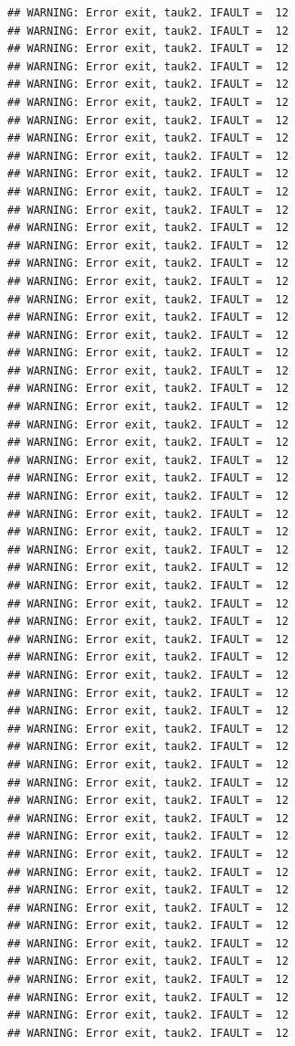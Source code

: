 \documentclass[
  12pt,
]{article}
\begin{document}
\begin{verbatim}
## WARNING: Error exit, tauk2. IFAULT =  12
## WARNING: Error exit, tauk2. IFAULT =  12
## WARNING: Error exit, tauk2. IFAULT =  12
## WARNING: Error exit, tauk2. IFAULT =  12
## WARNING: Error exit, tauk2. IFAULT =  12
## WARNING: Error exit, tauk2. IFAULT =  12
## WARNING: Error exit, tauk2. IFAULT =  12
## WARNING: Error exit, tauk2. IFAULT =  12
## WARNING: Error exit, tauk2. IFAULT =  12
## WARNING: Error exit, tauk2. IFAULT =  12
## WARNING: Error exit, tauk2. IFAULT =  12
## WARNING: Error exit, tauk2. IFAULT =  12
## WARNING: Error exit, tauk2. IFAULT =  12
## WARNING: Error exit, tauk2. IFAULT =  12
## WARNING: Error exit, tauk2. IFAULT =  12
## WARNING: Error exit, tauk2. IFAULT =  12
## WARNING: Error exit, tauk2. IFAULT =  12
## WARNING: Error exit, tauk2. IFAULT =  12
## WARNING: Error exit, tauk2. IFAULT =  12
## WARNING: Error exit, tauk2. IFAULT =  12
## WARNING: Error exit, tauk2. IFAULT =  12
## WARNING: Error exit, tauk2. IFAULT =  12
## WARNING: Error exit, tauk2. IFAULT =  12
## WARNING: Error exit, tauk2. IFAULT =  12
## WARNING: Error exit, tauk2. IFAULT =  12
## WARNING: Error exit, tauk2. IFAULT =  12
## WARNING: Error exit, tauk2. IFAULT =  12
## WARNING: Error exit, tauk2. IFAULT =  12
## WARNING: Error exit, tauk2. IFAULT =  12
## WARNING: Error exit, tauk2. IFAULT =  12
## WARNING: Error exit, tauk2. IFAULT =  12
## WARNING: Error exit, tauk2. IFAULT =  12
## WARNING: Error exit, tauk2. IFAULT =  12
## WARNING: Error exit, tauk2. IFAULT =  12
## WARNING: Error exit, tauk2. IFAULT =  12
## WARNING: Error exit, tauk2. IFAULT =  12
## WARNING: Error exit, tauk2. IFAULT =  12
## WARNING: Error exit, tauk2. IFAULT =  12
## WARNING: Error exit, tauk2. IFAULT =  12
## WARNING: Error exit, tauk2. IFAULT =  12
## WARNING: Error exit, tauk2. IFAULT =  12
## WARNING: Error exit, tauk2. IFAULT =  12
## WARNING: Error exit, tauk2. IFAULT =  12
## WARNING: Error exit, tauk2. IFAULT =  12
## WARNING: Error exit, tauk2. IFAULT =  12
## WARNING: Error exit, tauk2. IFAULT =  12
## WARNING: Error exit, tauk2. IFAULT =  12
## WARNING: Error exit, tauk2. IFAULT =  12
## WARNING: Error exit, tauk2. IFAULT =  12
## WARNING: Error exit, tauk2. IFAULT =  12
## WARNING: Error exit, tauk2. IFAULT =  12
## WARNING: Error exit, tauk2. IFAULT =  12
## WARNING: Error exit, tauk2. IFAULT =  12
## WARNING: Error exit, tauk2. IFAULT =  12
## WARNING: Error exit, tauk2. IFAULT =  12
## WARNING: Error exit, tauk2. IFAULT =  12
## WARNING: Error exit, tauk2. IFAULT =  12
## WARNING: Error exit, tauk2. IFAULT =  12

\end{verbatim}
\end{document}
